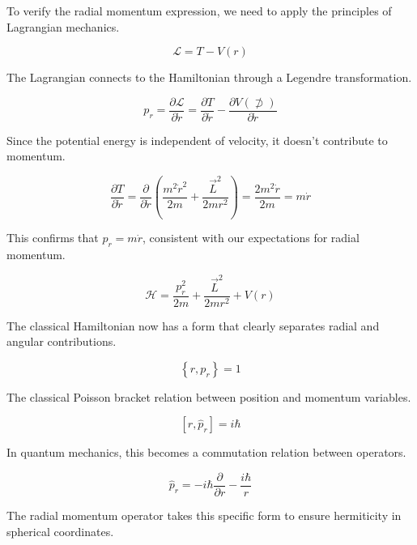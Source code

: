 \documentclass[italian]{HKNdocument}
\begin{document}
To verify the radial momentum expression, we need to apply the principles of Lagrangian mechanics.

\begin{equation}
\mathcal{L}=T-V(r)
\end{equation}

The Lagrangian connects to the Hamiltonian through a Legendre transformation.

\begin{equation}
p_{r}=\frac{\partial \mathcal{L}}{\partial \dot{r}}=\frac{\partial T}{\partial \dot{r}}-\frac{\partial V(\not \supset)}{\partial \dot{r}}
\end{equation}

Since the potential energy is independent of velocity, it doesn't contribute to momentum.

\begin{equation}
\frac{\partial T}{\partial \dot{r}}=\frac{\partial}{\partial \dot{r}}\left(\frac{m^{2} \dot{r}^{2}}{2 m}+\frac{\vec{L}^{2}}{2 m r^{2}}\right)=\frac{2 m^{2} \dot{r}}{2 m}=m \dot{r}
\end{equation}

This confirms that $p_r = m\dot{r}$, consistent with our expectations for radial momentum.

\begin{equation}
\mathcal{H}=\frac{p_{r}^{2}}{2 m}+\frac{\vec{L}^{2}}{2 m r^{2}}+V(r)
\end{equation}

The classical Hamiltonian now has a form that clearly separates radial and angular contributions.

\begin{equation}
\left\{r, p_{r}\right\}=1
\end{equation}

The classical Poisson bracket relation between position and momentum variables.

\begin{equation}
\left[r, \hat{p}_{r}\right]=i \hbar
\end{equation}

In quantum mechanics, this becomes a commutation relation between operators.

\begin{equation}
\hat{p}_{r}=-i \hbar \frac{\partial}{\partial r}-\frac{i \hbar}{r}
\end{equation}

The radial momentum operator takes this specific form to ensure hermiticity in spherical coordinates.
\end{document}
